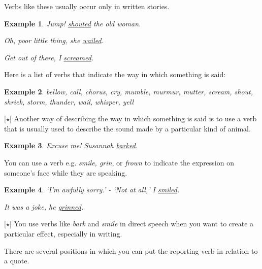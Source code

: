 \documentclass[oneside]{book}
\numberwithin{equation}{section}
\newtheorem{example}{Example}[section]
\begin{document}
Verbs like these usually occur only in written stories.
\begin{example}
    Jump! \underline{shouted} the old woman.
    
    Oh, poor little thing, she \underline{wailed}.
    
    Get out of there, I \underline{screamed}.
\end{example}
Here is a list of verbs that indicate the way in which something is said:
\begin{example}
    bellow, call, chorus, cry, mumble, murmur, mutter, scream, shout, shriek, storm, thunder, wail, whisper, yell
\end{example}
%
\noindent{} [$\star$] Another way of describing the way in which something is said is to use a verb that is usually used to describe the sound made by a particular kind of animal.
\begin{example}
    Excuse me! Susannah \underline{barked}.
\end{example}
You can use a verb e.g. \textit{smile, grin}, or \textit{frown} to indicate the expression on someone's face while they are speaking.
\begin{example}
    `I'm awfully sorry.' - `Not at all,' I \underline{smiled}.
    
    It was a joke, he \underline{grinned}.
\end{example}
%
\noindent{} [$\star$] You use verbs like \textit{bark} and \textit{smile} in direct speech when you want to create a particular effect, especially in writing.

%
\noindent{} There are several positions in which you can put the reporting verb in relation to a quote.
\end{document}
